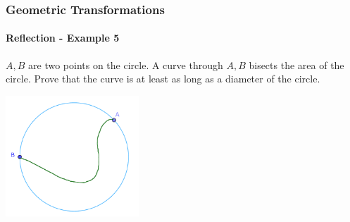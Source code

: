 \documentclass[8pt,xcolor=table,dvipsnames]{beamer}
\begin{document}
\begin{frame}[t]
    \frametitle{Geometric Transformations}
    \framesubtitle{Reflection - Example 5}
    \begin{example}
        $A, B$ are two points on the circle. A curve through $A, B$ bisects the area of the circle.
        Prove that the curve is at least as long as a diameter of the circle.    
    \end{example}

    \bigbreak
    \begin{center}
        \includegraphics[width=5cm]{./svg/pdf/23-24-sm2-s3-ci-p10.pdf}
    \end{center}
\end{frame}
\end{document}
